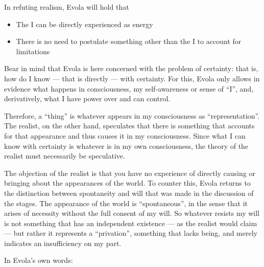 In refuting realism, Evola will hold that

\begin{itemize}


\item The I can be directly experienced as energy

\item There is no need to postulate something other than the I to account for limitations
\end{itemize}


Bear in mind that Evola is here concerned with the problem of certainty: that is, how do I know --- that is directly --- with certainty. For this, Evola only allows in evidence what happens in consciousness, my self-awareness or sense of ``I'', and, derivatively, what I have power over and can control.

Therefore, a ``thing'' is whatever appears in my consciousness as ``representation''. The realist, on the other hand, speculates that there is something that accounts for that appearance and thus causes it in my consciousness. Since what I can know with certainty is whatever is in my own consciousness, the theory of the realist must necessarily be speculative.

The objection of the realist is that you have no experience of directly causing or bringing about the appearances of the world. To counter this, Evola returns to the distinction between spontaneity and will that was made in the discussion of the stages. The appearance of the world is ``spontaneous'', in the sense that it arises of necessity without the full consent of my will. So whatever resists my will is not something that has an independent existence --- as the realist would claim --- but rather it represents a ``privation'', something that lacks being, and merely indicates an insufficiency on my part.

In Evola's own words:

